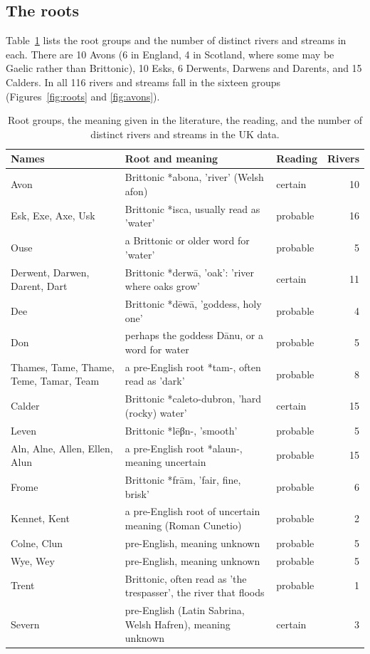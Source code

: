 \documentclass[11pt,a4paper]{article}
\begin{document}
\subsection{The roots}
Table~\ref{tab:roots} lists the root groups and the number of distinct rivers and streams in each. There are 10 Avons (6 in England, 4 in Scotland, where some may be Gaelic rather than Brittonic), 10 Esks, 6 Derwents, Darwens and Darents, and 15 Calders. In all 116 rivers and streams fall in the sixteen groups (Figures~\ref{fig:roots} and \ref{fig:avons}).

\begin{table}[tbp]\centering\small\caption{Root groups, the meaning given in the literature, the reading, and the number of distinct rivers and streams in the UK data.}\label{tab:roots}\begin{tabular}{p{4.2cm}p{6.6cm}lr}\toprule Names & Root and meaning & Reading & Rivers\\\midrule
Avon & Brittonic *abona, 'river' (Welsh afon) & certain & 10\\
Esk, Exe, Axe, Usk & Brittonic *isca, usually read as 'water' & probable & 16\\
Ouse & a Brittonic or older word for 'water' & probable & 5\\
Derwent, Darwen, Darent, Dart & Brittonic *derwā, 'oak': 'river where oaks grow' & certain & 11\\
Dee & Brittonic *dēwā, 'goddess, holy one' & probable & 4\\
Don & perhaps the goddess Dānu, or a word for water & probable & 5\\
Thames, Tame, Thame, Teme, Tamar, Team & a pre-English root *tam-, often read as 'dark' & probable & 8\\
Calder & Brittonic *caleto-dubron, 'hard (rocky) water' & certain & 15\\
Leven & Brittonic *lēβn-, 'smooth' & probable & 5\\
Aln, Alne, Allen, Ellen, Alun & a pre-English root *alaun-, meaning uncertain & probable & 15\\
Frome & Brittonic *frām, 'fair, fine, brisk' & probable & 6\\
Kennet, Kent & a pre-English root of uncertain meaning (Roman Cunetio) & probable & 2\\
Colne, Clun & pre-English, meaning unknown & probable & 5\\
Wye, Wey & pre-English, meaning unknown & probable & 5\\
Trent & Brittonic, often read as 'the trespasser', the river that floods & probable & 1\\
Severn & pre-English (Latin Sabrina, Welsh Hafren), meaning unknown & certain & 3\\
\bottomrule\end{tabular}\end{table}
\end{document}
